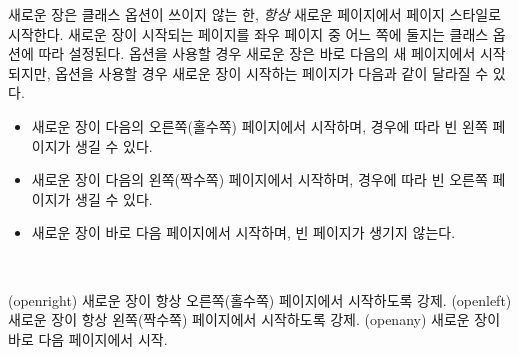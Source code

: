 새로운 장은  클래스 옵션이 쓰이지 않는 한,
\emph{항상} 새로운 페이지에서  페이지 스타일로 시작한다.
새로운 장이 시작되는 페이지를 좌우 페이지 중 어느 쪽에 둘지는 클래스 옵션에 따라 설정된다.
 옵션을 사용할 경우 새로운 장은 바로 다음의 새 페이지에서 시작되지만,
 옵션을 사용할 경우 새로운 장이 시작하는 페이지가 다음과 같이 달라질 수 있다.


\begin{itemize}
	\item[\Lopt{openright}] 새로운 장이 다음의 오른쪽(홀수쪽) 페이지에서 시작하며,
	경우에 따라 빈 왼쪽 페이지가 생길 수 있다.
	\item[\Lopt{openleft}] 새로운 장이 다음의 왼쪽(짝수쪽) 페이지에서 시작하며,
	경우에 따라 빈 오른쪽 페이지가 생길 수 있다.
	\item[\Lopt{openany}] 새로운 장이 바로 다음 페이지에서 시작하며,
	빈 페이지가 생기지 않는다.
\end{itemize}

\begin{syntax}
\cmd{\openright} \cmd{\openleft} \cmd{\openany} \\
\end{syntax}
\glossary(openright)%
  {}%
  {새로운 장이 항상 오른쪽(홀수쪽) 페이지에서 시작하도록 강제.}
\glossary(openleft)%
  {}%
  {새로운 장이 항상 왼쪽(짝수쪽) 페이지에서 시작하도록 강제.}
\glossary(openany)%
  {}%
  {새로운 장이 바로 다음 페이지에서 시작.}
  
